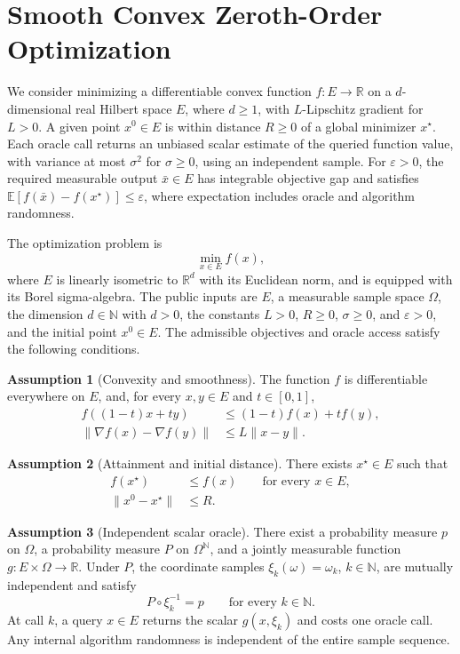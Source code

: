 \documentclass[10pt]{article}
\theoremstyle{definition}
\newtheorem{assumption}{Assumption}
\begin{document}
\section*{Smooth Convex Zeroth-Order Optimization}
We consider minimizing a differentiable convex function $f:E\to\mathbb{R}$ on a $d$-dimensional real Hilbert space $E$, where $d\geq 1$, with $L$-Lipschitz gradient for $L>0$. A given point $x^0\in E$ is within distance $R\geq 0$ of a global minimizer $x^\star$. Each oracle call returns an unbiased scalar estimate of the queried function value, with variance at most $\sigma^2$ for $\sigma\geq 0$, using an independent sample. For $\varepsilon>0$, the required measurable output $\bar{x}\in E$ has integrable objective gap and satisfies $\mathbb{E}[f(\bar{x})-f(x^\star)]\leq\varepsilon$, where expectation includes oracle and algorithm randomness.

The optimization problem is
\begin{equation}
\label{eq:problem}
\min_{x\in E} f(x),
\end{equation}
where $E$ is linearly isometric to $\mathbb{R}^d$ with its Euclidean norm, and is equipped with its Borel sigma-algebra. The public inputs are $E$, a measurable sample space $\Omega$, the dimension $d\in\mathbb{N}$ with $d>0$, the constants $L>0$, $R\geq 0$, $\sigma\geq 0$, and $\varepsilon>0$, and the initial point $x^0\in E$. The admissible objectives and oracle access satisfy the following conditions.

\begin{assumption}[Convexity and smoothness]
The function $f$ is differentiable everywhere on $E$, and, for every $x,y\in E$ and $t\in[0,1]$,
\begin{align}
f((1-t)x+ty) &\leq (1-t)f(x)+tf(y),\\
\|\nabla f(x)-\nabla f(y)\| &\leq L\|x-y\|.
\end{align}
\end{assumption}

\begin{assumption}[Attainment and initial distance]
There exists $x^\star\in E$ such that
\begin{align}
f(x^\star) &\leq f(x) \qquad \text{for every }x\in E,\\
\|x^0-x^\star\| &\leq R.
\end{align}
\end{assumption}

\begin{assumption}[Independent scalar oracle]
There exist a probability measure $p$ on $\Omega$, a probability measure $P$ on $\Omega^{\mathbb{N}}$, and a jointly measurable function $g:E\times\Omega\to\mathbb{R}$. Under $P$, the coordinate samples $\xi_k(\omega)=\omega_k$, $k\in\mathbb{N}$, are mutually independent and satisfy
\begin{equation}
P\circ\xi_k^{-1}=p \qquad \text{for every }k\in\mathbb{N}.
\end{equation}
At call $k$, a query $x\in E$ returns the scalar $g(x,\xi_k)$ and costs one oracle call. Any internal algorithm randomness is independent of the entire sample sequence.
\end{assumption}
\end{document}
